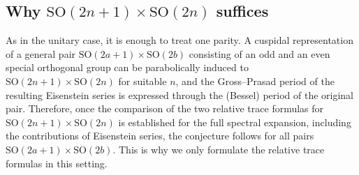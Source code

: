 \documentclass[11pt,oneside,notitlepage]{book}
\numberwithin{equation}{section}
\theoremstyle{plain}
\theoremstyle{definition}
\newcommand{\SO}{\mathrm{SO}}
\begin{document}

\subsection*{Why $\SO(2n+1)\times\SO(2n)$ suffices}
As in the unitary case, it is enough to treat one parity. A cuspidal representation of a general pair $\SO(2a+1)\times\SO(2b)$ consisting of an odd and an even special orthogonal group can be parabolically induced to $\SO(2n+1)\times\SO(2n)$ for suitable $n$, and the Gross--Prasad period of the resulting Eisenstein series is expressed through the (Bessel) period of the original pair. Therefore, once the comparison of the two relative trace formulas for $\SO(2n+1)\times\SO(2n)$ is established for the full spectral expansion, including the contributions of Eisenstein series, the conjecture follows for all pairs $\SO(2a+1)\times\SO(2b)$. This is why we only formulate the relative trace formulas in this setting.
\end{document}
